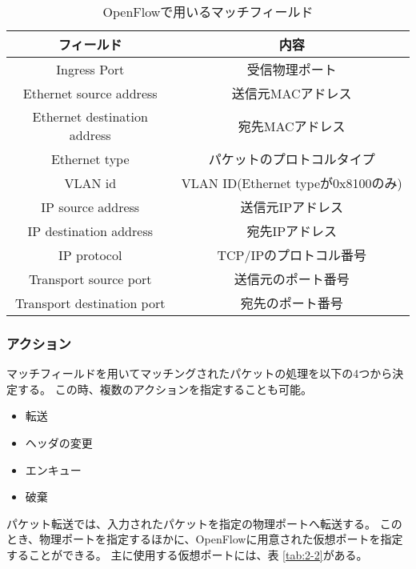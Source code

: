 \begin{table}[tb]
	\begin{center}
		\caption{OpenFlowで用いるマッチフィールド}
		\begin{tabular}{c|c}
			\hline \hline
			フィールド & 内容　\\ \hline
			Ingress Port & 受信物理ポート　\\
			Ethernet source address & 送信元MACアドレス \\
			Ethernet destination address & 宛先MACアドレス　\\
			Ethernet type & パケットのプロトコルタイプ \\
			VLAN id & VLAN ID(Ethernet typeが0x8100のみ)　\\
			IP source address & 送信元IPアドレス　\\
			IP destination address & 宛先IPアドレス　\\
			IP protocol & TCP/IPのプロトコル番号　\\
			Transport source port & 送信元のポート番号　\\
			Transport destination port & 宛先のポート番号\\ \hline
		\end{tabular}
		\label{tab:2-1}
	\end{center}
\end{table}

\subsubsection{アクション}

マッチフィールドを用いてマッチングされたパケットの処理を以下の4つから決定する\cite{openflowjapanese}。
この時、複数のアクションを指定することも可能。

\begin{itemize}
	\item 転送
	\item ヘッダの変更
	\item エンキュー
	\item 破棄
\end{itemize}

パケット転送では、入力されたパケットを指定の物理ポートへ転送する。
このとき、物理ポートを指定するほかに、OpenFlowに用意された仮想ポートを指定することができる。
主に使用する仮想ポートには、表 \ref{tab:2-2}がある。


